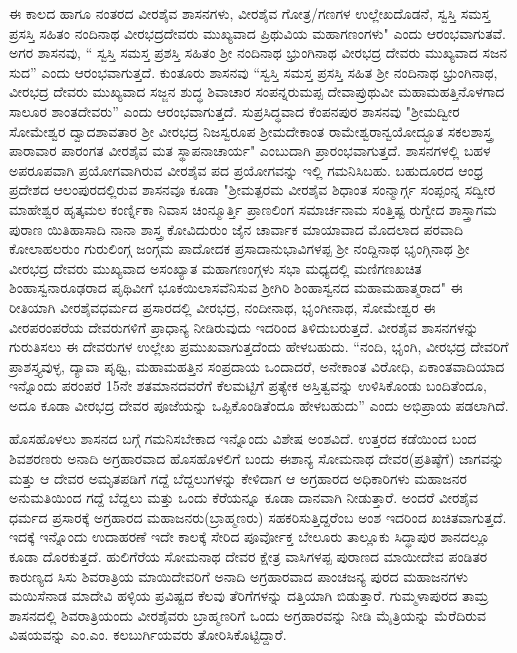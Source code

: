 ಈ ಕಾಲದ ಹಾಗೂ ನಂತರದ ವೀರಶೈವ ಶಾಸನಗಳು, ವೀರಶೈವ ಗೋತ್ರ/ಗಣಗಳ ಉಲ್ಲೇಖದೊಡನೆ, ಸ್ವಸ್ತಿ ಸಮಸ್ತ ಪ್ರಸಸ್ತಿ ಸಹಿತಂ ನಂದಿನಾಥ ವೀರಭದ್ರದೇವರು ಮುಖ್ಯವಾದ ಪ್ರಿಥುವಿಯ ಮಹಾಗಣಂಗಳು" ಎಂದು ಆರಂಭವಾಗುತವೆ. ಅಗರ ಶಾಸನವು, “ ಸ್ವಸ್ತಿ ಸಮಸ್ತ ಪ್ರಶಸ್ತಿ ಸಹಿತಂ ಶ‍್ರೀ ನಂದಿನಾಥ ಭ್ರುಂಗಿನಾಥ ವೀರಭದ್ರ ದೇವರು ಮುಖ್ಯವಾದ ಸಜನ ಸುದ” ಎಂದು ಆರಂಭವಾಗುತ್ತದೆ. ಕುಂತೂರು ಶಾಸನವು “ಸ್ವಸ್ತಿ ಸಮಸ್ತ ಪ್ರಸಸ್ತಿ ಸಹಿತ ಶ‍್ರೀ ನಂದಿನಾಥ ಭ್ರುಂಗಿನಾಥ, ವೀರಭದ್ರ ದೇವರು ಮುಖ್ಯವಾದ ಸಜ್ಜನ ಶುದ್ಧ ಶಿವಾಚಾರ ಸಂಪನ್ನರುಮಪ್ಪ ದೇವಾಪ್ರುಥುವೀ ಮಹಾಮಹತ್ತಿನೊಳಗಾದ ಸಾಲೂರ ಶಾಂತದೇವರು” ಎಂದು ಆರಂಭವಾಗುತ್ತದೆ. ಸುಪ್ರಸಿದ್ಧವಾದ ಕೆಂಪನಪುರ ಶಾಸನವು "ಶ‍್ರೀಮದ್ವೀರ ಸೋಮೇಶ್ವರ ದ್ವಾದಶಾವತಾರ ಶ‍್ರೀ ವೀರಭದ್ರ ನಿಜಸ್ವರೂಪ ಶ‍್ರೀಮದೇಕಾಂತ ರಾಮೇಶ್ವರಾನ್ವಯೋದ್ಭೂತ ಸಕಲಶಾಸ್ತ್ರ ಪಾರಾವಾರ ಪಾರಂಗತ ವೀರಶೈವ ಮತ ಸ್ಥಾಪನಾಚಾರ್ಯ" ಎಂಬುದಾಗಿ ಪ್ರಾರಂಭವಾಗುತ್ತದೆ. ಶಾಸನಗಳಲ್ಲಿ ಬಹಳ ಅಪರೂಪವಾಗಿ ಪ್ರಯೋಗವಾಗಿರುವ ವೀರಶೈವ ಪದ ಪ್ರಯೋಗವನ್ನು ಇಲ್ಲಿ ಗಮನಿಸಿಬಹು. ಬಹುದೂರದ ಆಂಧ್ರ ಪ್ರದೇಶದ ಆಲಂಪುರದಲ್ಲಿರುವ ಶಾಸನವೂ ಕೂಡಾ "ಶ‍್ರೀಮತ್ಪರಮ ವೀರಶೈವ ಶಿಧಾಂತ ಸಂನ್ಮಾರ್ಗ್ಗ ಸಂಪ್ಪಂನ್ನ ಸದ್ವೀರ ಮಾಹೇಶ್ವರ ಹೃತ್ಕಮಲ ಕಂರ್ಣ್ನಿಕಾ ನಿವಾಸ ಚಿಂನ್ಮೂರ್ತ್ತಿ ಪ್ರಾಣಲಿಂಗ ಸಮಾರ್ಚನಾಮ ಸಂತ್ತಿಷ್ಟ ರುಗ್ವೇದ ಶಾಸ್ತ್ರಾಗಮ ಪುರಾಣ ಯಿತಿಹಾಸಾದಿ ನಾನಾ ಶಾಸ್ತ್ರ ಕೋವಿದುರುಂ ಜೈನ ಚಾರ್ವಾಕ ಮಾಯಾವಾದ ಮೊದಲಾದ ಪರವಾದಿ ಕೋಲಾಹಲರುಂ ಗುರುಲಿಂಗ್ಗ ಜಂಗ್ಗಮ ಪಾದೋದಕ ಪ್ರಸಾದಾನುಭಾವಿಗಳಪ್ಪ ಶ‍್ರೀ ನಂದ್ದಿನಾಥ ಭೃಂಗ್ಗಿನಾಥ ಶ‍್ರೀ ವೀರಭದ್ರ ದೇವರು ಮುಖ್ಯವಾದ ಅಸಂಖ್ಯಾತ ಮಹಾಗಣಂಗ್ಗಳು ಸಭಾ ಮಧ್ಯದಲ್ಲಿ ಮಣಿಗಣಖಚಿತ ಶಿಂಹಾಸ್ವನಾರೂಢರಾದ ಪೃಥಿವೀಗೆ ಭೂಕಯಿಲಾಸವೆನಿಸುವ ಶ‍್ರೀಗಿರಿ ಶಿಂಹಾಸ್ವನದ ಮಹಾಮಹಾತ್ಮರಾದ" ಈ ರೀತಿಯಾಗಿ ವೀರಶೈವಧರ್ಮದ ಪ್ರಸಾರದಲ್ಲಿ ವೀರಭದ್ರ, ನಂದೀನಾಥ, ಭೃಂಗೀನಾಥ, ಸೋಮೇಶ್ವರ ಈ ವೀರಪರಂಪರೆಯ ದೇವರುಗಳಿಗೆ ಪ್ರಾಧಾನ್ಯ ನೀಡಿರುವುದು ಇದರಿಂದ ತಿಳಿದುಬರುತ್ತದೆ. ವೀರಶೈವ ಶಾಸನಗಳನ್ನು ಗುರುತಿಸಲು ಈ ದೇವರುಗಳ ಉಲ್ಲೇಖ ಪ್ರಮುಖವಾಗುತ್ತದೆಂದು ಹೇಳಬಹುದು. “ನಂದಿ, ಭೃಂಗಿ, ವೀರಭದ್ರ ದೇವರಿಗೆ ಪ್ರಾಶಸ್ತ್ಯವುಳ್ಳ, ದ್ಯಾವಾ ಪೃಥ್ವಿ, ಮಹಾಮಹತ್ತಿನ ಸಂಪ್ರದಾಯ ಒಂದಾದರೆ, ಅನೇಕಾಂತ ವಿರೋಧಿ, ಏಕಾಂತವಾದಿಯಾದ ಇನ್ನೊಂದು ಪರಂಪರೆ 15ನೇ ಶತಮಾನದವರೆಗೆ ಕೆಲಮಟ್ಟಿಗೆ ಪ್ರತ್ಯೇಕ ಅಸ್ತಿತ್ವವನ್ನು ಉಳಿಸಿಕೊಂಡು ಬಂದಿತೆಂದೂ, ಅದೂ ಕೂಡಾ ವೀರಭದ್ರ ದೇವರ ಪೂಜೆಯನ್ನು ಒಪ್ಪಿಕೊಂಡಿತೆಂದೂ ಹೇಳಬಹುದು” ಎಂದು ಅಭಿಪ್ರಾಯ ಪಡಲಾಗಿದೆ.

ಹೊಸಹೊಳಲು ಶಾಸನದ ಬಗ್ಗೆ ಗಮನಿಸಬೇಕಾದ ಇನ್ನೊಂದು ವಿಶೇಷ ಅಂಶವಿದೆ. ಉತ್ತರದ ಕಡೆಯಿಂದ ಬಂದ ಶಿವಶರಣರು ಅನಾದಿ ಅಗ್ರಹಾರವಾದ ಹೊಸಹೊಳಲಿಗೆ ಬಂದು ಈಶಾನ್ಯ ಸೋಮನಾಥ ದೇವರ(ಪ್ರತಿಷ್ಠೆಗೆ) ಜಾಗವನ್ನು ಮತ್ತು ಆ ದೇವರ ಅಮೃತಪಡಿಗೆ ಗದ್ದೆ ಬೆದ್ದಲುಗಳನ್ನು ಕೇಳಿದಾಗ ಆ ಅಗ್ರಹಾರದ ಅಧಿಕಾರಿಗಳು ಮಹಾಜನರ ಅನುಮತಿಯಿಂದ ಗದ್ದೆ ಬೆದ್ದಲು ಮತ್ತು ಒಂದು ಕೆರೆಯನ್ನೂ ಕೂಡಾ ದಾನವಾಗಿ ನೀಡುತ್ತಾರೆ. ಅಂದರೆ ವೀರಶೈವ ಧರ್ಮದ ಪ್ರಸಾರಕ್ಕೆ ಅಗ್ರಹಾರದ ಮಹಾಜನರು(ಬ್ರಾಹ್ಮಣರು) ಸಹಕರಿಸುತ್ತಿದ್ದರೆಂಬ ಅಂಶ ಇದರಿಂದ ಖಚಿತವಾಗುತ್ತದೆ. ಇದಕ್ಕೆ ಇನ್ನೊಂದು ಉದಾಹರಣೆ ಇದೇ ಕಾಲಕ್ಕೆ ಸೇರಿದ ಪೂರ್ವೋಕ್ತ ಬೇಲೂರು ತಾಲ್ಲೂಕು ಸಿದ್ಧಾಪುರ ಶಾನದಲ್ಲೂ ಕೂಡಾ ದೊರಕುತ್ತದೆ. ಹುಲಿಗೆರೆಯ ಸೋಮನಾಥ ದೇವರ ಕ್ಷೇತ್ರ ವಾಸಿಗಳಪ್ಪ ಪುರಾಣದ ಮಾಯೀದೇವ ಪಂಡಿತರ ಕಾರುಣ್ಯದ ಸಿಸು ಶಿವರಾತ್ರಿಯ ಮಾಯಿದೇವರಿಗೆ ಅನಾದಿ ಅಗ್ರಹಾರವಾದ ಪಾಂಚಜನ್ಯ ಪುರದ ಮಹಾಜನಗಳು ಮಯಿಸೆನಾಡ ಮಾದೇವಿ ಹಳ್ಳಿಯ ಪ್ರವಿಷ್ಟದ ಕೆಲವು ತೆರಿಗೆಗಳನ್ನು ದತ್ತಿಯಾಗಿ ಬಿಡುತ್ತಾರೆ. ಗುಮ್ಮಳಾಪುರದ ತಾಮ್ರ ಶಾಸನದಲ್ಲಿ ಶಿವರಾತ್ರಿಯಂದು ವೀರಶೈವರು ಬ್ರಾಹ್ಮಣರಿಗೆ ಒಂದು ಅಗ್ರಹಾರವನ್ನು ನೀಡಿ ಮೈತ್ರಿಯನ್ನು ಮೆರೆದಿರುವ ವಿಷಯವನ್ನು ಎಂ.ಎಂ. ಕಲಬುರ್ಗಿಯವರು ತೋರಿಸಿಕೊಟ್ಟಿದ್ದಾರೆ.


